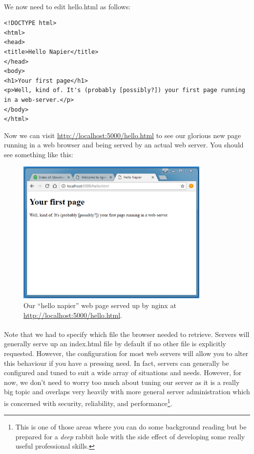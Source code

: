 \documentclass[10pt, a4paper, twosize]{article}
\begin{document}
\paragraph{} We now need to edit hello.html as follows:

\begin{lstlisting}
<!DOCTYPE html>
<html>
<head>
<title>Hello Napier</title>
</head>
<body>
<h1>Your first page</h1>
<p>Well, kind of. It's (probably [possibly?]) your first page running in a web-server.</p>
</body>
</html>
\end{lstlisting}

Now we can visit \url{http://localhost:5000/hello.html} to see our glorious new page running in a web browser and being served by an actual web server. You should see something like this:

\begin{figure}[H]
\centering
\includegraphics[width=0.85\textwidth]{images/nginx_hello}
\caption{Our ``hello napier'' web page served up by nginx at \url{http://localhost:5000/hello.html}.}
\label{fig:nginx_welcome}
\end{figure}

\paragraph{} Note that we had to specify which file the browser needed to retrieve. Servers will generally serve up an index.html file by default if no other file is explicitly requested. However, the configuration for most web servers will allow you to alter this behaviour if you have a pressing need. In fact, servers can generally be configured and tuned to suit a wide array of situations and needs. However, for now, we don't need to worry too much about tuning our server as it is a really big topic and overlaps very heavily with more general server administration which is concerned with security, reliability, and performance\footnote{This is one of those areas where you can do some background reading but be prepared for a \emph{deep} rabbit hole with the side effect of developing some really useful professional skills.}.
\end{document}
